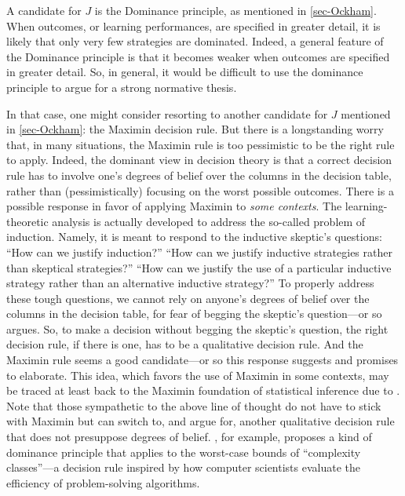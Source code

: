 A candidate for $J$ is the Dominance principle, as mentioned in \autoref{sec-Ockham}. When outcomes, or learning performances, are specified in greater detail, it is likely that only very few strategies are dominated. Indeed, a general feature of the Dominance principle is that it becomes weaker when outcomes are specified in greater detail. So, in general, it would be difficult to use the dominance principle to argue for a strong normative thesis. 

In that case, one might consider resorting to another candidate for $J$ mentioned in \autoref{sec-Ockham}: the Maximin decision rule. But there is a longstanding worry that, in many situations, the Maximin rule is too pessimistic to be the right rule to apply. Indeed, the dominant view in decision theory is that a correct decision rule has to involve one's degrees of belief over the columns in the decision table, rather than (pessimistically) focusing on the worst possible outcomes. There is a possible response in favor of applying Maximin to {\em some contexts}. The learning-theoretic analysis is actually developed to address the so-called problem of induction. Namely, it is meant to respond to the inductive skeptic's questions: ``How can we justify induction?'' ``How can we justify inductive strategies rather than skeptical strategies?'' ``How can we justify the use of a particular inductive strategy rather than an alternative inductive strategy?'' To properly address these tough questions, we cannot rely on anyone's degrees of belief over the columns in the decision table, for fear of begging the skeptic's question---or so \citet{lange2002okasha} argues. So, to make a decision without begging the skeptic's question, the right decision rule, if there is one, has to be a qualitative decision rule. And the Maximin rule seems a good candidate---or so this response suggests and promises to elaborate. This idea, which favors the use of Maximin in some contexts, may be traced at least back to the Maximin foundation of statistical inference due to \citet{wald1950statistical}. Note that those sympathetic to the above line of thought do not have to stick with Maximin but can switch to, and argue for, another qualitative decision rule that does not presuppose degrees of belief. \citet{kelly2007simplicity}, for example, proposes a kind of dominance principle that applies to the worst-case bounds of ``complexity classes''---a decision rule inspired by how computer scientists evaluate the efficiency of problem-solving algorithms.

